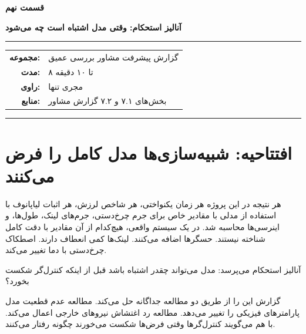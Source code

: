 \documentclass[12pt, a4paper]{article}
\newcommand{\dash}{\lr{---}}
\begin{document}

\thispagestyle{empty}

\vspace*{1.2cm}

{\centering
{\color{seriesblue}\fontsize{24}{30}\selectfont\bfseries قسمت نهم}

\vspace{0.5cm}
{\fontsize{15}{20}\selectfont\bfseries آناليز استحکام: وقتی مدل اشتباه است چه می‌شود}

\vspace{0.9cm}
{\color{seriesblue}\rule{0.55\linewidth}{1pt}}
\vspace{0.7cm}

{\normalsize
\begin{tabular}{rl}
  \textbf{مجموعه:}     & گزارش پيشرفت مشاور \dash{} بررسی عمیق \\[5pt]
  \textbf{مدت:}        & ۸ تا ۱۰ دقیقه \\[5pt]
  \textbf{راوی:}       & مجری تنها \\[5pt]
  \textbf{منابع:}      & بخش‌های ۷.۱ و ۷.۲ گزارش مشاور \\
\end{tabular}
}

\vspace{0.9cm}
{\color{seriesblue}\rule{0.55\linewidth}{0.4pt}}
\par}

\vspace{1.2cm}

\section{افتتاحیه: شبيه‌سازی‌ها مدل کامل را فرض می‌کنند}

هر نتيجه در اين پروژه \dash{} هر زمان يکنواختی، هر شاخص لرزش، هر اثبات لياپانوف \dash{} با استفاده از مدلی با مقادير خاص برای جرم چرخ‌دستی، جرم‌های لينک، طول‌ها، و اينرسی‌ها محاسبه شد. در يک سيستم واقعی، هيچ‌کدام از آن مقادير با دقت کامل شناخته نيستند. حسگرها اضافه می‌کنند. لينک‌ها کمی انعطاف دارند. اصطکاک چرخ‌دستی با دما تغيير می‌کند.

آناليز استحکام می‌پرسد: مدل می‌تواند چقدر اشتباه باشد قبل از اينکه کنترل‌گر شکست بخورد؟

گزارش اين را از طريق دو مطالعه جداگانه حل می‌کند. مطالعه عدم قطعيت مدل  پارامترهای فيزيکی را تغيير می‌دهد. مطالعه رد اغتشاش  نيروهای خارجی اعمال می‌کند. با هم می‌گويند کنترل‌گرها وقتی فرض‌ها شکست می‌خورند چگونه رفتار می‌کنند.
\end{document}
